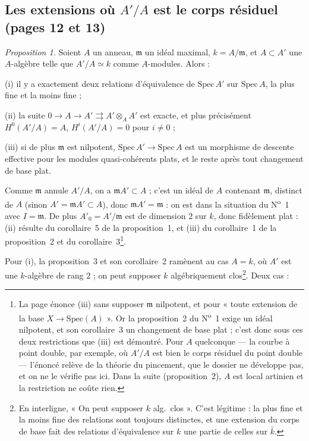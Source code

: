 \documentclass[11pt,a4paper]{article}
\begin{document}
\subsection*{Les extensions où $A'/A$ est le corps résiduel (pages 12 et 13)}

\emph{Proposition 1.} Soient $A$ un anneau, $\mathfrak{m}$ un idéal maximal,
$k = A/\mathfrak{m}$, et $A \subset A'$ une $A$-algèbre telle que $A'/A
\simeq k$ comme $A$-modules. Alors :

(i) il y a exactement deux relations d'équivalence de $\mathrm{Spec}\, A'$
sur $\mathrm{Spec}\, A$, la plus fine et la moins fine ;

(ii) la suite $0 \to A \to A' \rightrightarrows A' \otimes_A A'$ est exacte,
et plus précisément $H^0(A'/A) = A$, $H^i(A'/A) = 0$ pour $i \neq 0$ ;

(iii) si de plus $\mathfrak{m}$ est nilpotent, $\mathrm{Spec}\, A' \to
\mathrm{Spec}\, A$ est un morphisme de descente effective pour les modules
quasi-cohérents plats, et le reste après tout changement de base plat.

Comme $\mathfrak{m}$ annule $A'/A$, on a $\mathfrak{m}A' \subset A$ ; c'est un
idéal de $A$ contenant $\mathfrak{m}$, distinct de $A$ (sinon $A' =
\mathfrak{m}A' \subset A$), donc $\mathfrak{m}A' = \mathfrak{m}$ : on est dans
la situation du N\textsuperscript{o}~1 avec $I = \mathfrak{m}$. De plus
$A'_0 = A'/\mathfrak{m}$ est de dimension $2$ sur $k$, donc fidèlement plat :
(ii) résulte du corollaire~5 de la proposition~1, et (iii) du corollaire~1 de
la proposition~2 et du corollaire~3\footnote{La page énonce (iii) sans
supposer $\mathfrak{m}$ nilpotent, et pour « toute extension de la base $X \to
\mathrm{Spec}(A)$ ». Or la proposition~2 du N\textsuperscript{o}~1 exige un
idéal nilpotent, et son corollaire~3 un changement de base plat ; c'est donc
sous ces deux restrictions que (iii) est démontré. Pour $A$ quelconque —
la courbe à point double, par exemple, où $A'/A$ est bien le corps résiduel
du point double — l'énoncé relève de la théorie du pincement, que le dossier
ne développe pas, et on ne le vérifie pas ici. Dans la suite (proposition~2),
$A$ est local artinien et la restriction ne coûte rien.}.

Pour (i), la proposition~3 et son corollaire~2 ramènent au cas $A = k$, où
$A'$ est une $k$-algèbre de rang $2$ ; on peut supposer $k$ algébriquement
clos\footnote{En interligne, « On peut supposer $k$ alg.\ clos ». C'est
légitime : la plus fine et la moins fine des relations sont toujours
distinctes, et une extension du corps de base fait des relations
d'équivalence sur $k$ une partie de celles sur $\bar{k}$.}. Deux cas :
\end{document}
